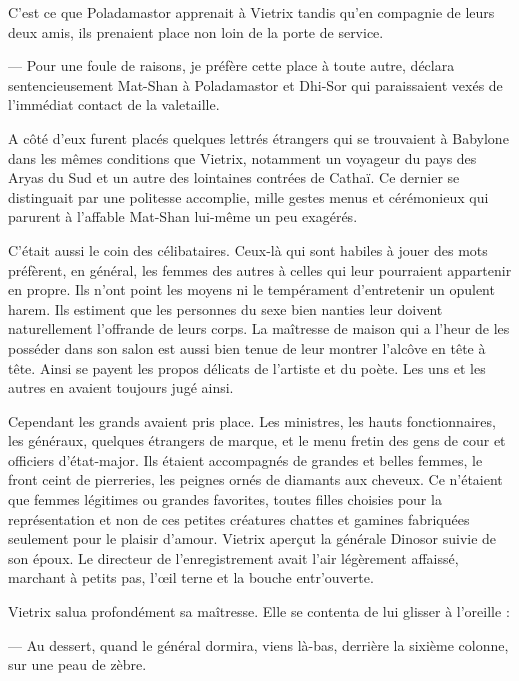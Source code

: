 \documentclass[a4paper, 11pt, oneside, polutonikogreek, french]{article}
\begin{document}
C'est ce que Poladamastor apprenait à Vietrix tandis qu'en compagnie de leurs deux amis, ils prenaient place non loin de la porte de service.

--- Pour une foule de raisons, je préfère cette place à toute autre, déclara sentencieusement Mat-Shan à Poladamastor et Dhi-Sor qui paraissaient vexés de l'immédiat contact de la valetaille.

A côté d'eux furent placés quelques lettrés étrangers qui se trouvaient à Babylone dans les mêmes conditions que Vietrix, notamment un voyageur du pays des Aryas du Sud et un autre des lointaines contrées de Cathaï. Ce dernier se distinguait par une politesse accomplie, mille gestes menus et cérémonieux qui parurent à l'affable Mat-Shan lui-même un peu exagérés.

C'était aussi le coin des célibataires. Ceux-là qui sont habiles à jouer des mots préfèrent, en général, les femmes des autres à celles qui leur pourraient appartenir en propre. Ils n'ont point les moyens ni le tempérament d'entretenir un opulent harem. Ils estiment que les personnes du sexe bien nanties leur doivent naturellement l'offrande de leurs corps. La maîtresse de maison qui a l'heur de les posséder dans son salon est aussi bien tenue de leur montrer l'alcôve en tête à tête. Ainsi se payent les propos délicats de l'artiste et du poète. Les uns et les autres en avaient toujours jugé ainsi.

\bigskip
\centerline{\EightStarTaper}
\centerline{\EightStarTaper\EightStarTaper}
\bigskip

Cependant les grands avaient pris place. Les ministres, les hauts fonctionnaires, les généraux, quelques étrangers de marque, et le menu fretin des gens de cour et officiers d'état-major. Ils étaient accompagnés de grandes et belles femmes, le front ceint de pierreries, les peignes ornés de diamants aux cheveux. Ce n'étaient que femmes légitimes ou grandes favorites, toutes filles choisies pour la représentation et non de ces petites créatures chattes et gamines fabriquées seulement pour le plaisir d'amour. Vietrix aperçut la générale Dinosor suivie de son époux. Le directeur de l'enregistrement avait l'air légèrement affaissé, marchant à petits pas, l'œil terne et la bouche entr'ouverte.

Vietrix salua profondément sa maîtresse. Elle se contenta de lui glisser à l'oreille :

--- Au dessert, quand le général dormira, viens là-bas, derrière la sixième colonne, sur une peau de zèbre.
\end{document}
